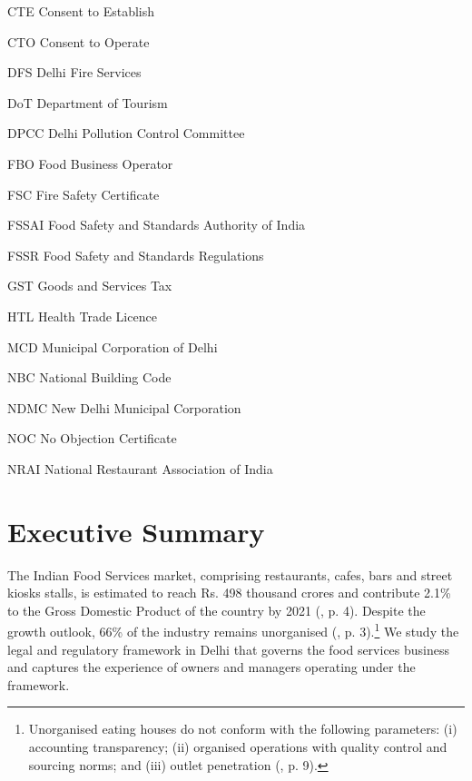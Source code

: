 \documentclass[a4paper, 12pt, twoside]{article}
\begin{document}
        
        \begin{abbrv}        
        
 		\item[CTE]		Consent to Establish
 		\item[CTO]		Consent to Operate
 		\item[DFS]		Delhi Fire Services
 		\item[DoT]			Department of Tourism
 		\item[DPCC]		Delhi Pollution Control Committee
 		\item[FBO]		Food Business Operator
 		\item[FSC]		Fire Safety Certificate
		\item[FSSAI]		Food Safety and Standards Authority of India 
 		\item[FSSR]		Food Safety and Standards Regulations
 		\item[GST]		Goods and Services Tax
 		\item[HTL]			Health Trade Licence
 		\item[MCD]		Municipal Corporation of Delhi
 		\item[NBC]		National Building Code
 		\item[NDMC]		New Delhi Municipal Corporation
 		\item[NOC	]		No Objection Certificate
 		\item[NRAI]		National Restaurant Association of India  
             
               \end{abbrv}
          
                        
                    \newpage
                    \section*{Executive Summary}
                    
                    
                    The Indian Food Services market, comprising restaurants, cafes, bars and street kiosks stalls, is estimated to reach Rs. 498 thousand crores and contribute 2.1\% to the Gross Domestic Product of the country by 2021 (\cite{kpmg2016foodservindustry}, p. 4). Despite the growth outlook, 66\% of the industry remains unorganised (\cite{kpmg2016foodservindustry}, p. 3).\footnote{Unorganised eating houses do not conform with the following parameters: (i) accounting transparency; (ii) organised operations with quality control and sourcing norms; and (iii) outlet penetration (\cite{ficci2017foodservindustry}, p. 9).} We study the legal and regulatory framework in Delhi that governs the food services business and captures the experience of owners and managers operating under the framework.\\
                   
\end{document}
